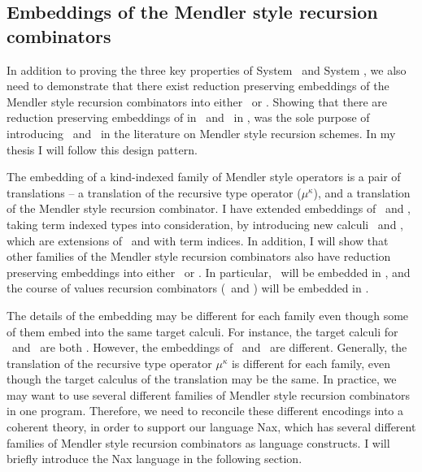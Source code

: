 \subsection{Embeddings of the Mendler style recursion combinators} In
addition to proving the three key properties of System \Fi\ and System
\Fixi, we also need to demonstrate that there exist reduction preserving
embeddings of the Mendler style recursion combinators into either \Fi\ or
\Fixi. Showing that there are reduction preserving embeddings of \MIt in
\Fw\ and \MPr\ in \Fixw, was the sole purpose of introducing \Fw\ and \Fixw\ in
the literature on Mendler style recursion schemes. In my thesis
I will follow this design pattern.

The embedding of a kind-indexed family of Mendler style operators is
a pair of translations -- a translation of the recursive type operator
($\mu^\kappa$), and a translation of the Mendler style recursion combinator. 
I have extended embeddings of \MIt\ and \MPr, taking term indexed
types into consideration, by introducing new calculi \Fi\ and \Fixw,
which are extensions of \Fw\ and \Fixi with term indices. In addition,
I will show that other families of the Mendler style recursion combinators
also have reduction preserving embeddings into either \Fi\ or \Fixi.
In particular, \MsfIt\ will be embedded in \Fi, and the course of values
recursion combinators (\McvIt\ and \McvPr) will be embedded in \Fixi.

The details of the embedding may be different for each family even though
some of them embed into the same target calculi. For instance, the target
calculi for \MIt\ and \MsfIt\ are both \Fi. However, the embeddings
of \MIt\ and \MsfIt\ are different. Generally, the translation of
the recursive type operator $\mu^\kappa$ is different for each family,
even though the target calculus of the translation may be the same.
In practice, we may want to use several different families of Mendler style
recursion combinators in one program. Therefore, we need to reconcile
these different encodings into a coherent theory, in order to support
our language Nax, which has several different families of Mendler style
recursion combinators as language constructs. I will briefly introduce
the Nax language in the following section.

